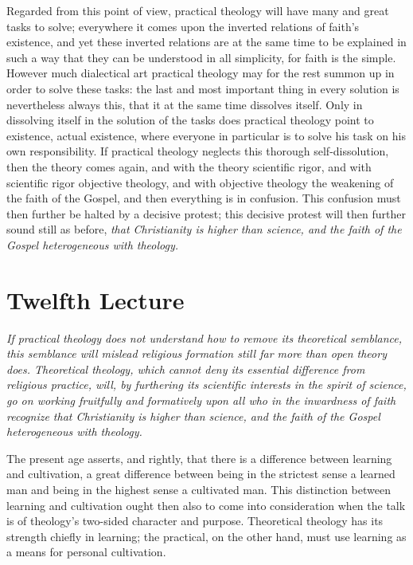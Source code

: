 \documentclass[12pt,a4paper]{book}
\begin{document}
Regarded from this point of view, practical theology will have many and great tasks to solve; everywhere it
comes upon the inverted relations of faith's existence, and yet these inverted relations are at the same time
to be explained in such a way that they can be understood in all
simplicity, for faith is the simple. However much dialectical art practical theology may for the rest summon
up in order to solve these tasks: the last and most important thing in every solution is nevertheless always
this, that it at the same time dissolves itself. Only in dissolving itself in the solution of the tasks does
practical theology point to existence, actual existence, where everyone in particular is to solve his task on
his own responsibility. If practical theology neglects this thorough self-dissolution, then the theory comes
again, and with the theory scientific rigor, and with scientific rigor objective theology, and with objective
theology the weakening of the faith of the Gospel, and then everything is in confusion. This confusion must
then further be halted by a decisive protest; this decisive protest will then further sound still as before,
\emph{that Christianity is higher than science, and the faith of the Gospel heterogeneous with theology.}

\chapter*{Twelfth Lecture}
\label{ch:forel12}

\begin{center}\itshape
If practical theology does not understand how to remove its theoretical
semblance, this semblance will mislead religious formation still far more
than open theory does. Theoretical theology, which cannot deny its essential
difference from religious practice, will, by furthering its scientific
interests in the spirit of science, go on working fruitfully and formatively
upon all who in the inwardness of faith recognize that Christianity is
higher than science, and the faith of the Gospel heterogeneous with theology.
\end{center}

The present age asserts, and rightly, that there is a difference between learning and cultivation, a
great difference between being in the strictest sense a learned man and being in the highest sense a
cultivated man. This distinction between learning and cultivation ought then also to come into
consideration when the talk is of theology's two-sided character and purpose. Theoretical theology has
its strength chiefly in learning; the practical, on the other hand, must use learning as a means for
personal cultivation.
\end{document}
